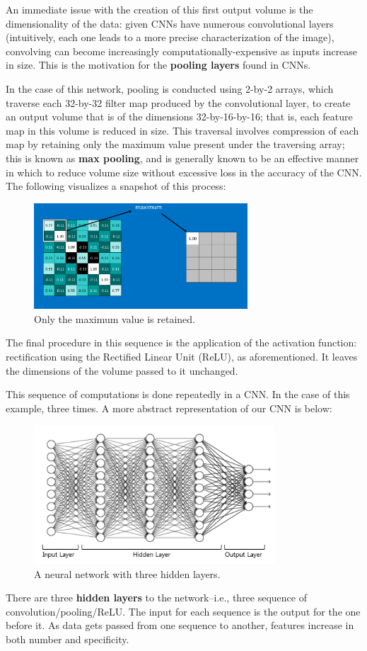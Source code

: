 \documentclass[a4paper, 11pt]{article} %
\begin{document}
	An immediate issue with the creation of this first output volume is the dimensionality of the data: 
	given CNNs have numerous convolutional layers (intuitively, each one leads to a more precise 
	characterization of the image), convolving can become increasingly computationally-expensive as 
	inputs increase in size. This is the motivation for the \textbf{pooling layers} found in CNNs. 
	
	In the case of this network, pooling is conducted using 2-by-2 arrays, which traverse each 32-by-32 
	filter map produced by the convolutional layer, to create an output volume that is of the dimensions 
	32-by-16-by-16; that is, each feature map in this volume is reduced in size. This traversal involves 
	compression of each map by retaining only the maximum value present under the traversing array; 
	this is known as \textbf{max pooling}, and is generally known to be an effective manner in which to 
	reduce volume size without excessive loss in the accuracy of the CNN. The following visualizes a 
	snapshot of this process:
	\vskip 5mm
	\begin{figure}[h]
		\centering
		\includegraphics[width=8cm]{figures/pooling.png}
		\caption{Only the maximum value is retained.}
	\end{figure}

	The final procedure in this sequence is the application of the activation function: rectification using 
	the Rectified Linear Unit (ReLU), as aforementioned. It leaves the dimensions of the volume passed 
	to it unchanged. 
		
	This sequence of computations is done repeatedly in a CNN. In the case of this example, three 
	times. A more abstract representation of our CNN is below:
	\vskip 5mm
	\begin{figure}[h]
		\centering
		\includegraphics[width=9cm]{figures/three_hidden_layers.png}
		\caption{A neural network with three hidden layers.}
	\end{figure}
	There are three \textbf{hidden layers} to the network--i.e., three sequence of 
	convolution/pooling/ReLU. The input for each sequence is the output for the one before it. As data 
	gets passed from one sequence to another, features increase in both number and specificity.
\end{document}

